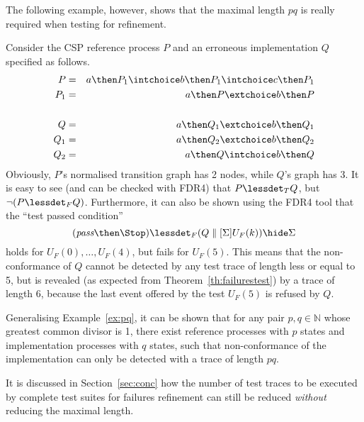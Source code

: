 The following example, however, shows that the maximal length $pq$ is really required 
when testing for refinement.
\begin{example}\label{ex:pq}
Consider the CSP reference process $P$ and an erroneous implementation $Q$ specified
as follows.
\begin{eqnarray*}
P & = & a \then P_1 \intchoice b \then P_1 \intchoice c \then P_1
\\
P_1 & = & a \then P \extchoice b\then P
\\ & &  \\
Q & = & a\then Q_1 \extchoice b\then Q_1
\\
Q_1 & = & a\then Q_2 \extchoice b\then Q_2
\\
Q_2 & = & a\then Q \intchoice b\then Q
\end{eqnarray*}
Obviously, $P$'s normalised transition graph has 2 nodes, 
while $Q$'s graph has 3.
It is easy to see (and can be checked with FDR4) that $P\lessdet_T Q$, but 
$\neg(P\lessdet_F Q)$. Furthermore, it can also be shown using the FDR4 tool that
the ``test passed condition'' 
\[
(\epass\then\Stop) \lessdet_F (Q\parallel[\Sigma] U_F(k))\hide \Sigma
\]
holds for $U_F(0),\dots,U_F(4)$, but fails for $U_F(5)$. This means that the
non-conformance of $Q$ cannot be detected by any test trace of length 
less or equal to 5, but is revealed (as expected from Theorem~\ref{th:failurestest})
by a trace of length 6, because the last event offered by the test $U_F(5)$ is 
refused by $Q$.
\xbox
\end{example}
%
Generalising Example~\ref{ex:pq}, it can be shown that for any pair $p,q\in\mathbb{N}$
whose greatest common divisor is 1, there exist reference processes with $p$ states
and implementation processes with $q$ states, such that non-conformance of the 
implementation
can only be detected with a trace of length $pq$.

It is discussed in Section~\ref{sec:conc} how the number of test traces to be executed 
by complete test suites for failures refinement   can still be reduced {\it without} reducing 
the maximal length.


